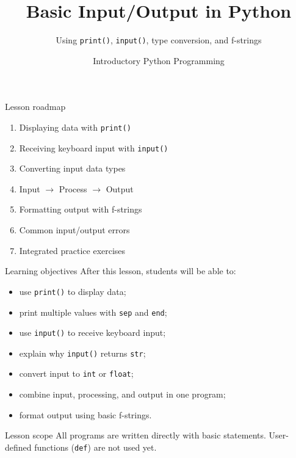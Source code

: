 \documentclass[aspectratio=169,10pt]{beamer}
\title[Basic I/O in Python]{Basic Input/Output in Python}
\subtitle{Using \texttt{print()}, \texttt{input()}, type conversion, and f-strings}
\author{Introductory Python Programming}
\date{}
\begin{document}
\begin{frame}
  \titlepage
\end{frame}

\begin{frame}{Lesson roadmap}
\begin{enumerate}
  \item Displaying data with \texttt{print()}
  \item Receiving keyboard input with \texttt{input()}
  \item Converting input data types
  \item Input $\rightarrow$ Process $\rightarrow$ Output
  \item Formatting output with f-strings
  \item Common input/output errors
  \item Integrated practice exercises
\end{enumerate}
\end{frame}

\begin{frame}{Learning objectives}
After this lesson, students will be able to:
\begin{itemize}
  \item use \texttt{print()} to display data;
  \item print multiple values with \texttt{sep} and \texttt{end};
  \item use \texttt{input()} to receive keyboard input;
  \item explain why \texttt{input()} returns \texttt{str};
  \item convert input to \texttt{int} or \texttt{float};
  \item combine input, processing, and output in one program;
  \item format output using basic f-strings.
\end{itemize}
\begin{alertblock}{Lesson scope}
All programs are written directly with basic statements. User-defined functions (\texttt{def}) are not used yet.
\end{alertblock}
\end{frame}
\end{document}
